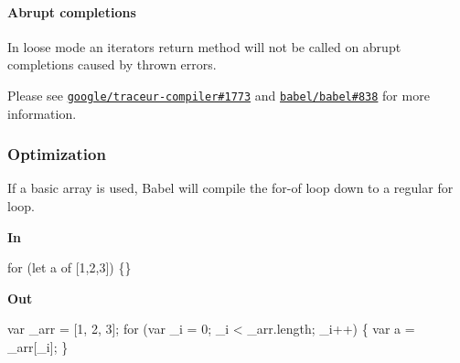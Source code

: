 \paragraph*{Abrupt completions}

In loose mode an iterator\textquotesingle{}s {\ttfamily return} method will not be called on abrupt completions caused by thrown errors.

Please see \href{https://github.com/google/traceur-compiler/issues/1773}{\tt google/traceur-\/compiler\#1773} and \href{https://github.com/babel/babel/issues/838}{\tt babel/babel\#838} for more information.

\subsubsection*{Optimization}

If a basic array is used, Babel will compile the for-\/of loop down to a regular for loop.

{\bfseries In}


\begin{DoxyCode}
for (let a of [1,2,3]) \{\}
\end{DoxyCode}


{\bfseries Out}


\begin{DoxyCode}
var \_arr = [1, 2, 3];
for (var \_i = 0; \_i < \_arr.length; \_i++) \{
  var a = \_arr[\_i];
\}
\end{DoxyCode}
 